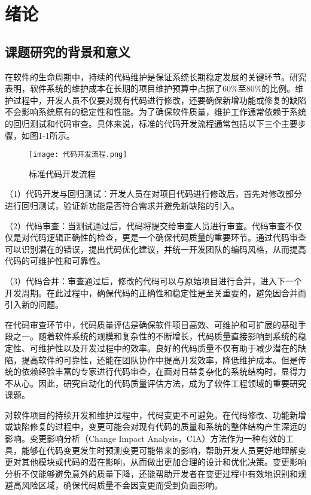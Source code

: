 
\chapter{绪论}

\section{课题研究的背景和意义}

在软件的生命周期中，持续的代码维护是保证系统长期稳定发展的关键环节。研究表明，软件系统的维护成本在长期的项目维护预算中占据了60\%至80\%的比例\cite{2012Maintenance}。维护过程中，开发人员不仅要对现有代码进行修改，还要确保新增功能或修复的缺陷不会影响系统原有的稳定性和性能。为了确保软件质量，维护工作通常依赖于系统的回归测试和代码审查。具体来说，标准的代码开发流程通常包括以下三个主要步骤，如图1-1所示。

\begin{figure}[h]
\centering
\texttt{[image: 代码开发流程.png]}
\caption{标准代码开发流程}
\end{figure}

（1）代码开发与回归测试：开发人员在对项目代码进行修改后，首先对修改部分进行回归测试，验证新功能是否符合需求并避免新缺陷的引入。

（2）代码审查：当测试通过后，代码将提交给审查人员进行审查。代码审查不仅仅是对代码逻辑正确性的检查，更是一个确保代码质量的重要环节。通过代码审查可以识别潜在的错误，提出代码优化建议，并统一开发团队的编码风格，从而提高代码的可维护性和可靠性。

（3）代码合并：审查通过后，修改的代码可以与原始项目进行合并，进入下一个开发周期。在此过程中，确保代码的正确性和稳定性是至关重要的，避免因合并而引入新的问题。

在代码审查环节中，代码质量评估是确保软件项目高效、可维护和可扩展的基础手段之一。随着软件系统的规模和复杂性的不断增长，代码质量直接影响到系统的稳定性、可维护性以及开发过程中的效率。良好的代码质量不仅有助于减少潜在的缺陷，提高软件的可靠性，还能在团队协作中提高开发效率，降低维护成本。但是传统的依赖经验丰富的专家进行代码审查，在面对日益复杂化的系统结构时，显得力不从心\cite{2016Microservices}。因此，研究自动化的代码质量评估方法，成为了软件工程领域的重要研究课题。

对软件项目的持续开发和维护过程中，代码变更不可避免。在代码修改、功能新增或缺陷修复的过程中，变更可能会对现有代码的质量和系统的整体结构产生深远的影响。变更影响分析（Change Impact Analysis，CIA）方法作为一种有效的工具，能够在代码变更发生时预测变更可能带来的影响，帮助开发人员更好地理解变更对其他模块或代码的潜在影响，从而做出更加合理的设计和优化决策。变更影响分析不仅能够避免意外的质量下降，还能帮助开发者在变更过程中有效地识别和规避高风险区域，确保代码质量不会因变更而受到负面影响。

